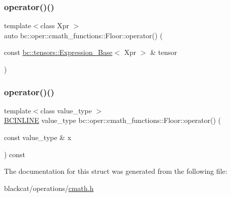 \mbox{\label{structbc_1_1oper_1_1cmath__functions_1_1Floor_ac5fae14bd1b3ce422cd36191111c1493}} 
\subsubsection{\texorpdfstring{operator()()}{operator()()}\hspace{0.1cm}{\footnotesize\ttfamily [2/3]}}
{\footnotesize\ttfamily template$<$class Xpr $>$ \\
auto bc\+::oper\+::cmath\+\_\+functions\+::\+Floor\+::operator() (\begin{DoxyParamCaption}\item[{const \hyperlink{classbc_1_1tensors_1_1Expression__Base}{bc\+::tensors\+::\+Expression\+\_\+\+Base}$<$ Xpr $>$ \&}]{tensor }\end{DoxyParamCaption})\hspace{0.3cm}{\ttfamily [inline]}}

\mbox{\label{structbc_1_1oper_1_1cmath__functions_1_1Floor_a2723a0e43d0c54aafc95862154ac01fd}} 
\subsubsection{\texorpdfstring{operator()()}{operator()()}\hspace{0.1cm}{\footnotesize\ttfamily [3/3]}}
{\footnotesize\ttfamily template$<$class value\+\_\+type $>$ \\
\hyperlink{common_8h_a6699e8b0449da5c0fafb878e59c1d4b1}{B\+C\+I\+N\+L\+I\+NE} value\+\_\+type bc\+::oper\+::cmath\+\_\+functions\+::\+Floor\+::operator() (\begin{DoxyParamCaption}\item[{const value\+\_\+type \&}]{x }\end{DoxyParamCaption}) const\hspace{0.3cm}{\ttfamily [inline]}}



The documentation for this struct was generated from the following file\+:\begin{DoxyCompactItemize}
\item 
blackcat/operations/\hyperlink{cmath_8h}{cmath.\+h}\end{DoxyCompactItemize}

